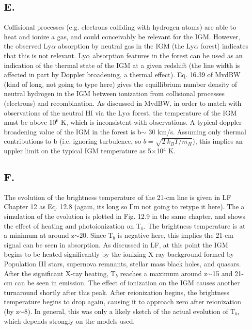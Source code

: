 \documentclass[a4paper]{article}
\begin{document}
\subsection{E.}
Collisional processes (e.g. electrons colliding with hydrogen atoms)
are able to heat and ionize a gas, and could conceivably be relevant for the 
IGM. However, the observed Ly$\alpha$ absorption by neutral gas in the IGM
(the Ly$\alpha$ forest) indicates that this is not relevant. Ly$\alpha$ absorption
features in the forest can be used as an indication of the thermal state of the
IGM at a given redshift (the line width is affected in part by Doppler broadening,
a thermal effect). Eq. 16.39 of MvdBW (kind of long, not going to type here)
gives the equillibrium number density of neutral hydrogen in the IGM between ionization
from collisional processes (electrons) and recombination.
As discussed in MvdBW, in order to match with observations of 
the neutral HI via the Ly$\alpha$ forest, the temperature of the IGM must be
above 10$^{6}$ K, which is inconsistent with observations. A typical doppler
broadening value of the IGM in the forest is b$\sim$ 30 km/s. Assuming only 
thermal contributions to b (i.e. ignoring turbulence, so 
$b = \sqrt{2~k_{B}T/m_{H}}$), this implies
an uppler limit on the typical IGM temperature as 5$\times$10$^{4}$ K.

\subsection{F.}
The evolution of the brightness temperature of the 21-cm line is given in LF
Chapter 12 as Eq. 12.8 (again, its long so I'm not going to retype it here).
The a simulation of the evolution is plotted in Fig. 12.9 in the same chapter,
and shows the effect of heating and photoionization on T$_{b}$. The brightness
temperature is at a minimum at around z$\sim$20. Since T$_{b}$ is negative here,
this implies the 21-cm signal can be seen in absorption. As discussed in LF, at 
this point the IGM begins to be heated significantly by the ionizing
X-ray background formed by Population III stars, supernova remnants,
stellar mass black holes, and quasars. After the significant X-ray heating,
T$_{b}$ reaches a maximum around z$\sim$15 and 21-cm can be seen in emission. 
The effect of ionization on the IGM causes another turnaround shortly after
this peak. After reionization begins, the brightness temperature begins to
drop again, causing it to approach zero after reionization (by z$\sim$8). In 
general, this was only a likely sketch of the actual evolution of T$_{b}$, which
depends strongly on the models used. 
\end{document}
